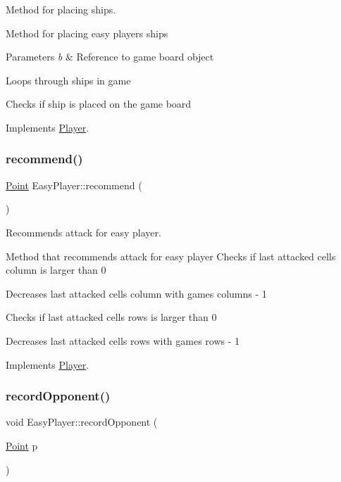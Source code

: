 Method for placing ships. 

Method for placing easy player\textquotesingle{}s ships 
\begin{DoxyParams}{Parameters}
{\em b} & Reference to game board object \\
\hline
\end{DoxyParams}
Loops through ships in game

Checks if ship is placed on the game board 

Implements \mbox{\hyperlink{class_player_ab89c1180c7314d3e19bcf4b2bed2e02a}{Player}}.

\mbox{\label{class_easy_player_a9b00f4a9acc74ff688c609bc15bdbb4d}} 
\subsubsection{\texorpdfstring{recommend()}{recommend()}}
{\footnotesize\ttfamily \mbox{\hyperlink{class_point}{Point}} Easy\+Player\+::recommend (\begin{DoxyParamCaption}{ }\end{DoxyParamCaption})\hspace{0.3cm}{\ttfamily [virtual]}}



Recommends attack for easy player. 

Method that recommends attack for easy player Checks if last attacked cell\textquotesingle{}s column is larger than 0

Decreases last attacked cell\textquotesingle{}s column with game\textquotesingle{}s columns -\/ 1

Checks if last attacked cell\textquotesingle{}s rows is larger than 0

Decreases last attacked cell\textquotesingle{}s rows with game\textquotesingle{}s rows -\/ 1 

Implements \mbox{\hyperlink{class_player_a2cc7a83d11158eafd8d49d4b9f23ce56}{Player}}.

\mbox{\label{class_easy_player_a2121149ace67b4a67a5dfa7633738ea3}} 
\subsubsection{\texorpdfstring{record\+Opponent()}{recordOpponent()}}
{\footnotesize\ttfamily void Easy\+Player\+::record\+Opponent (\begin{DoxyParamCaption}\item[{\mbox{\hyperlink{class_point}{Point}}}]{p }\end{DoxyParamCaption})\hspace{0.3cm}{\ttfamily [virtual]}}



